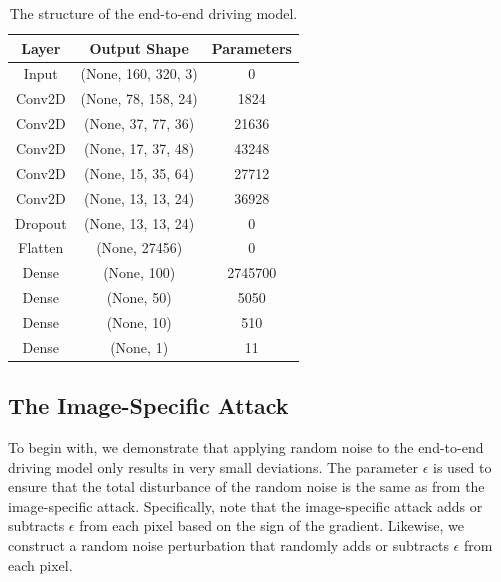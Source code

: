 \begin{table}[H]
\begin{center}
\begin{tabular}{ c c c }
     \hline
     Layer & Output Shape & Parameters \\ 
     \hline
     Input & (None, 160, 320, 3) & 0 \\  
     Conv2D & (None, 78, 158, 24) & 1824 \\  
     Conv2D & (None, 37, 77, 36) & 21636 \\  
     Conv2D & (None, 17, 37, 48) & 43248 \\  
     Conv2D & (None, 15, 35, 64) & 27712 \\  
     Conv2D & (None, 13, 13, 24) & 36928 \\
     Dropout & (None, 13, 13, 24) & 0 \\
     Flatten & (None, 27456) & 0 \\
     Dense & (None, 100) & 2745700 \\
     Dense & (None, 50) & 5050 \\
     Dense & (None, 10) & 510 \\
     Dense & (None, 1) & 11 \\
     \hline
    \end{tabular}
    \caption{The structure of the end-to-end driving model. \label{table_NVIDIA_model}}
\end{center}
\end{table}

\clearpage

\subsection{The Image-Specific Attack}

To begin with, we demonstrate that applying random noise to the end-to-end driving model only results in very small deviations. The parameter $\epsilon$ is used to ensure that the total disturbance of the random noise is the same as from the image-specific attack. Specifically, note that the image-specific attack adds or subtracts $\epsilon$ from each pixel based on the sign of the gradient. Likewise, we construct a random noise perturbation that randomly adds or subtracts $\epsilon$ from each pixel. 

